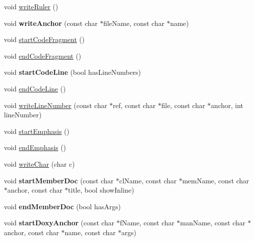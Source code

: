 \begin{DoxyCompactItemize}
\item 
void \hyperlink{class_output_list_a9fd641c75c5b5ee59a974c3b476584c2}{write\-Ruler} ()
\item 
\hypertarget{class_output_list_ad10e211d7701ea029222192f10efdf8e}{void {\bfseries write\-Anchor} (const char $\ast$file\-Name, const char $\ast$name)}\label{class_output_list_ad10e211d7701ea029222192f10efdf8e}

\item 
void \hyperlink{class_output_list_a631953fed580c2b82e39426604c928ac}{start\-Code\-Fragment} ()
\item 
void \hyperlink{class_output_list_a0d97d57c34ed239bcf916104a71e10bf}{end\-Code\-Fragment} ()
\item 
\hypertarget{class_output_list_a87ce1b5dc3773f8bb8c74ca64d99022f}{void {\bfseries start\-Code\-Line} (bool has\-Line\-Numbers)}\label{class_output_list_a87ce1b5dc3773f8bb8c74ca64d99022f}

\item 
void \hyperlink{class_output_list_adbe51a89cf6f9573b3434e7cfda81a7c}{end\-Code\-Line} ()
\item 
void \hyperlink{class_output_list_a70366bf2bad21036a14d68e9ef532809}{write\-Line\-Number} (const char $\ast$ref, const char $\ast$file, const char $\ast$anchor, int line\-Number)
\item 
void \hyperlink{class_output_list_ab2f79d1f1a30e329f7ada3e51c04917e}{start\-Emphasis} ()
\item 
void \hyperlink{class_output_list_a5c4adfb425dee0e192e5b606eab0114a}{end\-Emphasis} ()
\item 
void \hyperlink{class_output_list_a0031a638b9159c2d16d2988da4b901ab}{write\-Char} (char c)
\item 
\hypertarget{class_output_list_aa198e247536d4f5cfc5266a5ad6a8097}{void {\bfseries start\-Member\-Doc} (const char $\ast$cl\-Name, const char $\ast$mem\-Name, const char $\ast$anchor, const char $\ast$title, bool show\-Inline)}\label{class_output_list_aa198e247536d4f5cfc5266a5ad6a8097}

\item 
\hypertarget{class_output_list_a9f9b6887e1f87c3c55ddffa4a447f057}{void {\bfseries end\-Member\-Doc} (bool has\-Args)}\label{class_output_list_a9f9b6887e1f87c3c55ddffa4a447f057}

\item 
\hypertarget{class_output_list_ae53ee4f22f957f141bdf9df8b626d61c}{void {\bfseries start\-Doxy\-Anchor} (const char $\ast$f\-Name, const char $\ast$man\-Name, const char $\ast$anchor, const char $\ast$name, const char $\ast$args)}\label{class_output_list_ae53ee4f22f957f141bdf9df8b626d61c}


\end{DoxyCompactItemize}
